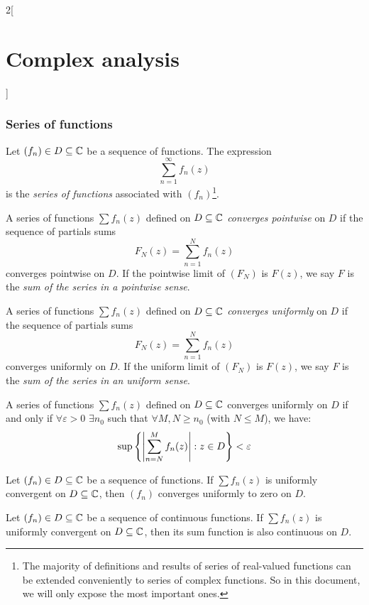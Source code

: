 \documentclass[../../../main_math.tex]{subfiles}
\begin{document}
\begin{multicols}{2}[\section{Complex analysis}]
  \subsubsection{Series of functions}
  \begin{definition}
    Let $(f_n)\in D\subseteq\mathbb{C}$ be a sequence of functions. The expression $$\sum_{n=1}^\infty f_n(z)$$ is the \emph{series of functions} associated with $(f_n)$\footnote{The majority of definitions and results of series of real-valued functions can be extended conveniently to series of complex functions. So in this document, we will only expose the most important ones.}.
  \end{definition}
  \begin{definition}
    A series of functions $\sum f_n(z)$ defined on $D\subseteq\mathbb{C}$ \emph{converges pointwise} on $D$ if the sequence of partials sums $$F_N(z)=\sum_{n=1}^Nf_n(z)$$ converges pointwise on $D$. If the pointwise limit of $(F_N)$ is $F(z)$, we say $F$ is the \emph{sum of the series in a pointwise sense}.
  \end{definition}
  \begin{definition}
    A series of functions $\sum f_n(z)$ defined on $D\subseteq\mathbb{C}$ \emph{converges uniformly} on $D$ if the sequence of partials sums $$F_N(z)=\sum_{n=1}^Nf_n(z)$$ converges uniformly on $D$. If the uniform limit of $(F_N)$ is $F(z)$, we say $F$ is the \emph{sum of the series in an uniform sense}.
  \end{definition}
  \begin{theorem}
    A series of functions $\sum f_n(z)$ defined on $D\subseteq\mathbb{C}$ converges uniformly on $D$ if and only if $\forall\varepsilon>0$ $\exists n_0$ such that $\forall  M, N\geq n_0$ (with $N\leq M$), we have: $$\sup\left\{\abs{\sum_{n=N}^Mf_n(z)}:z\in D\right\}< \varepsilon$$
  \end{theorem}
  \begin{corollary}
    Let $(f_n)\in D\subseteq\mathbb{C}$ be a sequence of functions. If $\sum f_n(z)$ is uniformly convergent on $D\subseteq\mathbb{C}$, then $(f_n)$ converges uniformly to zero on $D$.
  \end{corollary}
  \begin{theorem}
    Let $(f_n)\in D\subseteq\mathbb{C}$ be a sequence of continuous functions. If $\sum f_n(z)$ is uniformly convergent on $D\subseteq\mathbb{C}$, then its sum function is also continuous on $D$.
  \end{theorem}
  \begin{theorem}

\end{theorem}
\end{multicols}
\end{document}
